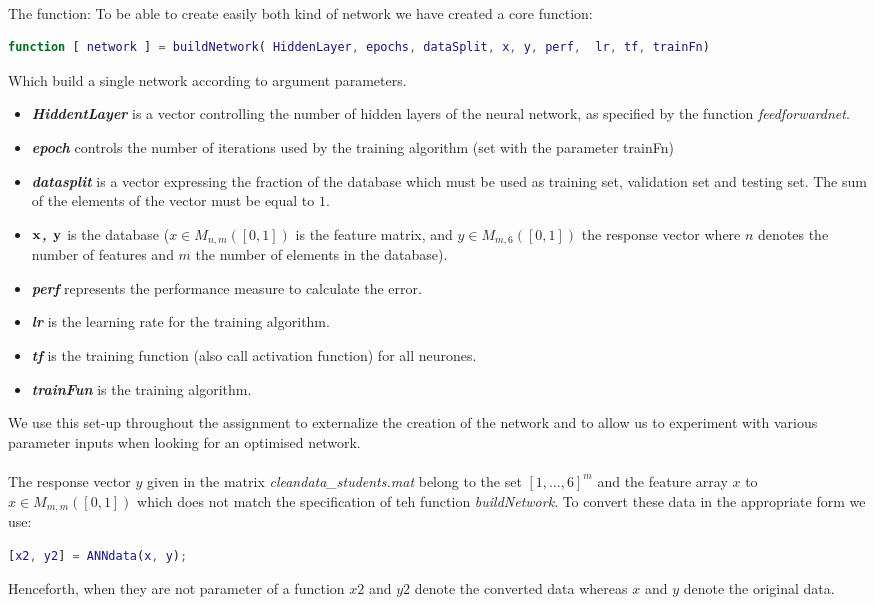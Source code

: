 \documentclass[a4paper,12pt,oneside,final]{report}
\newenvironment{changemargin}[2]{\begin{list}{}{%
\setlength{\topsep}{0pt}%
\setlength{\leftmargin}{0pt}%
\setlength{\rightmargin}{0pt}%
\setlength{\listparindent}{\parindent}%
\setlength{\itemindent}{\parindent}%
\setlength{\parsep}{0pt plus 1pt}%
\addtolength{\leftmargin}{#1}%
\addtolength{\rightmargin}{#2}%
}\item }{\end{list}}
\begin{document}
\paragraph{} The function:
To be able to create easily both kind of network we have created a core function:
\begin{changemargin}{-5mm}{-5mm}
\begin{lstlisting}[language=Matlab, frame=single]
function [ network ] = buildNetwork( HiddenLayer, epochs, dataSplit, x, y, perf,  lr, tf, trainFn)
\end{lstlisting}
\end{changemargin}
Which build a single network according to argument parameters. 
\label{ch:build}
\begin{itemize}
\item {\bf \textit{HiddentLayer} } is a vector controlling the number of hidden layers of the neural network, as specified by the function \textit{feedforwardnet}.
\item {\bf \textit{epoch} } controls the number of iterations used by the training algorithm (set with the parameter trainFn) 
\item {\bf \textit{datasplit} } is a vector expressing the fraction of the database which must be used as training set, validation set and testing set. The sum of the elements of the vector must be equal to $1$.
\item {\bf \textit{$\bf x$, $\bf y$} } is the database ($x\in M_{n,m}([0,1])$ is the feature matrix, and $y\in M_{m,6}([0,1])$ the response vector where $n$ denotes the number of features and $m$ the number of elements in the database).
\item {\bf \textit{perf} } represents the performance measure to calculate the error.
\item {\bf \textit{lr} } is the learning rate for the training algorithm.
\item {\bf \textit{tf} } is the training function (also call activation function) for all neurones.
\item {\bf \textit{trainFun} } is the training algorithm.
\end{itemize}
We use this set-up throughout the assignment to externalize the creation of the network and to allow us to experiment with various parameter inputs when looking for an optimised network.
\paragraph{}
The response vector $y$ given in the matrix \textit{cleandata\_students.mat} belong to the set $[1,\hdots,6]^m$ and the feature array $x$ to $x\in M_{m,m}([0,1])$ which does not match the specification of teh function \textit{buildNetwork}. To convert these data in the appropriate form we use:
\begin{changemargin}{-5mm}{-5mm}
\begin{lstlisting}[language=Matlab, frame=single]
[x2, y2] = ANNdata(x, y);
\end{lstlisting}
\end{changemargin}
Henceforth, when they are not parameter of a function $x2$ and $y2$ denote the converted data whereas $x$ and $y$ denote the original data.
\end{document}
